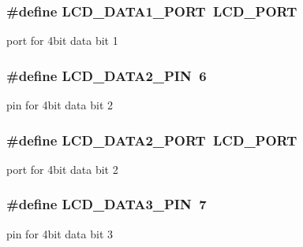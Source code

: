 \subsubsection[{\texorpdfstring{L\+C\+D\+\_\+\+D\+A\+T\+A1\+\_\+\+P\+O\+RT}{LCD_DATA1_PORT}}]{\setlength{\rightskip}{0pt plus 5cm}\#define L\+C\+D\+\_\+\+D\+A\+T\+A1\+\_\+\+P\+O\+RT~{\bf L\+C\+D\+\_\+\+P\+O\+RT}}\hypertarget{group__pfleury__lcd_ga345af0248d5739bd8896d4f585618ca2}{}\label{group__pfleury__lcd_ga345af0248d5739bd8896d4f585618ca2}
port for 4bit data bit 1 
\subsubsection[{\texorpdfstring{L\+C\+D\+\_\+\+D\+A\+T\+A2\+\_\+\+P\+IN}{LCD_DATA2_PIN}}]{\setlength{\rightskip}{0pt plus 5cm}\#define L\+C\+D\+\_\+\+D\+A\+T\+A2\+\_\+\+P\+IN~6}\hypertarget{group__pfleury__lcd_ga7f3d53627337f6535cc8daa35876510a}{}\label{group__pfleury__lcd_ga7f3d53627337f6535cc8daa35876510a}
pin for 4bit data bit 2 
\subsubsection[{\texorpdfstring{L\+C\+D\+\_\+\+D\+A\+T\+A2\+\_\+\+P\+O\+RT}{LCD_DATA2_PORT}}]{\setlength{\rightskip}{0pt plus 5cm}\#define L\+C\+D\+\_\+\+D\+A\+T\+A2\+\_\+\+P\+O\+RT~{\bf L\+C\+D\+\_\+\+P\+O\+RT}}\hypertarget{group__pfleury__lcd_ga4d5c48a3f2b9426c14bbca3150834a20}{}\label{group__pfleury__lcd_ga4d5c48a3f2b9426c14bbca3150834a20}
port for 4bit data bit 2 
\subsubsection[{\texorpdfstring{L\+C\+D\+\_\+\+D\+A\+T\+A3\+\_\+\+P\+IN}{LCD_DATA3_PIN}}]{\setlength{\rightskip}{0pt plus 5cm}\#define L\+C\+D\+\_\+\+D\+A\+T\+A3\+\_\+\+P\+IN~7}\hypertarget{group__pfleury__lcd_ga54032ce0050853e181f879b69fec4370}{}\label{group__pfleury__lcd_ga54032ce0050853e181f879b69fec4370}
pin for 4bit data bit 3 
